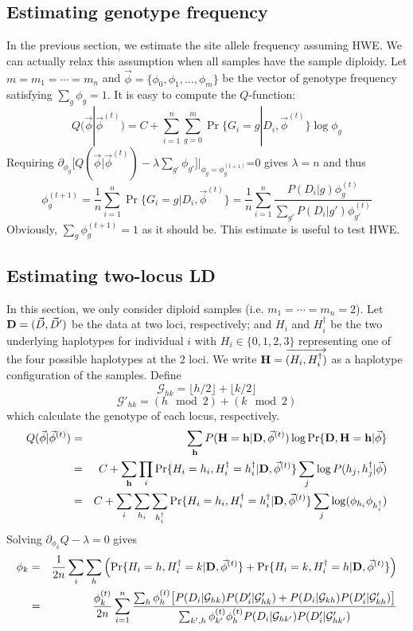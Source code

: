 \documentclass[pdftex,10pt]{book}
\begin{document}
\subsection{Estimating genotype frequency}
In the previous section, we estimate the site allele frequency assuming HWE.
We can actually relax this assumption when all samples have the sample diploidy.
Let $m=m_1=\cdots=m_n$ and $\vec{\phi}=\{\phi_0,\phi_1,\ldots,\phi_m\}$ be the vector of
genotype frequency satisfying $\sum_g\phi_g=1$. It is easy to compute the $Q$-function:
$$
Q(\vec{\phi}|\vec{\phi}^{(t)})=C+\sum_{i=1}^n\sum_{g=0}^m\Pr\{G_i=g|D_i,\vec{\phi}^{(t)}\}\log\phi_g
$$
Requiring $\partial_{\phi_g}\big[Q(\vec{\phi}|\vec{\phi}^{(t)})-\lambda\sum_{g'}\phi_{g'}\big]\Big|_{\phi_g=\phi_g^{(t+1)}}$=0 gives $\lambda=n$
and thus
$$
\phi_g^{(t+1)}=\frac{1}{n}\sum_{i=1}^n\Pr\{G_i=g|D_i,\vec{\phi}^{(t)}\}=\frac{1}{n}\sum_{i=1}^n\frac{P(D_i|g)\phi_g^{(t)}}{\sum_{g'}P(D_i|g')\phi_{g'}^{(t)}}
$$
Obviously, $\sum_g\phi_g^{(t+1)}=1$ as it should be. This estimate is useful to test HWE.

\subsection{Estimating two-locus LD}
In this section, we only consider diploid samples
(i.e. $m_1=\cdots=m_n=2$). Let ${\bf D}=(\vec{D},\vec{D}')$ be the data
at two loci, respectively; and $H_i$ and $H^{\dag}_i$ be the two
underlying haplotypes for individual $i$ with $H_i\in\{0,1,2,3\}$
representing one of the four possible haplotypes at the 2 loci. We write
${\bf H}=\overrightarrow{(H_i,H^{\dag}_i)}$ as a haplotype configuration of the
samples. Define
$$
\mathcal{G}_{hk}=\lfloor h/2\rfloor+\lfloor k/2\rfloor
$$
$$
\mathcal{G}'_{hk}=(h\mod 2)+(k\mod 2)
$$
which calculate the genotype of each locus, respectively.
\begin{eqnarray*}
  Q(\vec{\phi}|\vec{\phi}^{(t)})&=&\sum_{\bf h}P({\bf H}={\bf h}|{\bf D},\vec{\phi}^{(t)})\log\Pr\{{\bf D},{\bf H}={\bf h}|\vec{\phi}\}\\
  &=&C+\sum_{\bf h}\prod_i\Pr\{H_i=h_i,H^{\dag}_i=h^{\dag}_i|{\bf D},\vec{\phi}^{(t)}\}\sum_j\log P(h_j,h^{\dag}_j|\vec{\phi})\\
  &=&C+\sum_i\sum_{h_i}\sum_{h^{\dag}_i}\Pr\{H_i=h_i,H^{\dag}_i=h^{\dag}_i|{\bf D},\vec{\phi}^{(t)}\}\sum_j\log(\phi_{h_i}\phi_{h^{\dag}_i})
\end{eqnarray*}
Solving $\partial_{\phi_k}Q-\lambda=0$ gives
\begin{eqnarray*}
\phi_k&=&\frac{1}{2n}\sum_i\sum_h\left(\Pr\{H_i=h,H^{\dag}_i=k|{\bf D},\vec{\phi}^{(t)}\}+\Pr\{H_i=k,H^{\dag}_i=h|{\bf D},\vec{\phi}^{(t)}\}\right)\\
&=&\frac{\phi^{(t)}_k}{2n}\sum_{i=1}^n\frac{\sum_{h}\phi^{(t)}_h\big[P(D_i|{\cal G}_{hk})P(D'_i|{\cal G}'_{hk})+P(D_i|{\cal G}_{kh})P(D'_i|{\cal G}'_{kh})\big]}{\sum_{k',h}\phi^{(t)}_{k'}\phi^{(t)}_hP(D_i|{\cal G}_{hk'})P(D'_i|{\cal G}'_{hk'})}
\end{eqnarray*}
\end{document}
